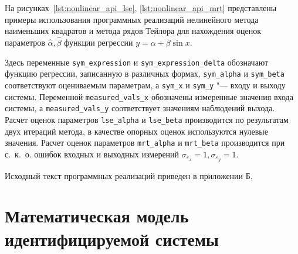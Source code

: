 На рисунках~\ref{lst:nonlinear_api_lse}, \ref{lst:nonlinear_api_mrt}
представлены примеры использования программных реализаций
нелинейного метода наименьших квадратов и метода рядов Тейлора для
нахождения оценок параметров \( \hat{\alpha}, \hat{\beta} \)
функции регрессии \( y = \alpha + \beta \sin{x} \).

\pagebreak


\vspace{4\baselineskip}


Здесь переменные \texttt{sym\_expression} и \texttt{sym\_expression\_delta}
обозначают функцию регрессии, записанную в различных формах,
\texttt{sym\_alpha} и \texttt{sym\_beta} соответствуют оцениваемым параметрам,
а \texttt{sym\_x} и \texttt{sym\_y} "--- входу и выходу системы.
Переменной \texttt{measured\_vals\_x} обозначены измеренные значения входа системы,
а \texttt{measured\_vals\_y} соответствует значениям наблюдений выхода.
Расчет оценок параметров \texttt{lse\_alpha} и \texttt{lse\_beta} производится по
результатам двух итераций метода, в качестве опорных оценок используются нулевые значения.
Расчет оценок параметров \texttt{mrt\_alpha} и \texttt{mrt\_beta} производится
при с.~к.~о. ошибок входных и выходных измерений
\( \sigma_{\varepsilon_x } = 1, \sigma_{\varepsilon_y } = 1 \).

Исходный текст программных реализаций приведен в приложении Б.

\vspace{2\baselineskip}
\section{Математическая модель идентифицируемой системы}

